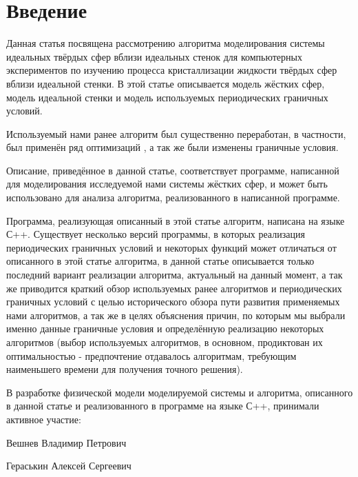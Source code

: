 \documentclass[a4paper]{article}
\begin{document}

\tableofcontents
\pagebreak

\section{Введение}

Данная статья посвящена рассмотрению алгоритма моделирования системы идеальных твёрдых сфер вблизи идеальных стенок для компьютерных экспериментов по изучению процесса кристаллизации жидкости твёрдых сфер вблизи идеальной стенки. В этой статье описывается модель жёстких сфер, модель идеальной стенки и модель используемых периодических граничных условий.

Используемый нами ранее алгоритм \cite{Veshnev_Nurlygayanov_Cristalization_of_hard_spheres_near_the_hard_wall_ru_2011} был существенно переработан, в частности, был применён ряд оптимизаций \cite{Miller_Luding_Event_driven_molecular_dynamics_in_parallel} \cite{Rapaport_The_Event_Driven_Approach_to_N_Body_Simulation} \cite{Belkin_MMD_2006}, а так же были изменены граничные условия.

Описание, приведённое в данной статье, соответствует программе, написанной для моделирования исследуемой нами системы жёстких сфер, и может быть использовано для анализа алгоритма, реализованного в написанной программе.

Программа, реализующая описанный в этой статье алгоритм, написана на языке С++. Существует несколько версий программы, в которых реализация периодических граничных условий и некоторых функций может отличаться от описанного в этой статье алгоритма, в данной статье описывается только последний вариант реализации алгоритма, актуальный на данный момент, а так же приводится краткий обзор используемых ранее алгоритмов и периодических граничных условий с целью исторического обзора пути развития применяемых нами алгоритмов, а так же в целях объяснения причин, по которым мы выбрали именно данные граничные условия и определённую реализацию некоторых алгоритмов (выбор используемых алгоритмов, в основном, продиктован их оптимальностью - предпочтение отдавалось алгоритмам, требующим наименьшего времени для получения точного решения).

В разработке физической модели моделируемой системы и алгоритма, описанного в данной статье и реализованного в программе на языке С++, принимали активное участие:

Вешнев Владимир Петрович

Гераськин Алексей Сергеевич
\end{document}
